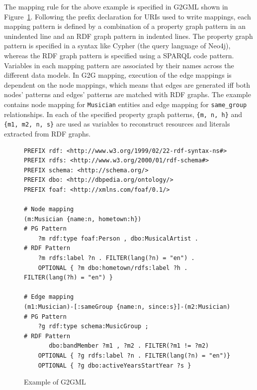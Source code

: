 \documentclass[runningheads]{llncs}
\begin{document}
The mapping rule for the above example is specified in G2GML shown in Figure~\ref{fig:g2gml}. Following the prefix declaration for URIs used to write mappings, each mapping pattern is defined by a combination of a property graph pattern in an unindented line and an RDF graph pattern in indented lines. The property graph pattern is specified in a syntax like Cypher (the query language of Neo4j), whereas the RDF graph pattern is specified using a SPARQL code pattern. 
Variables in each mapping pattern are associated by their names across the different data models. 
In G2G mapping, execution of the edge mappings is dependent on the node mappings, which means that edges are generated iff both nodes' patterns and edges' patterns are matched with RDF graphs. 
The example contains node mapping for \texttt{Musician} entities and edge mapping for \texttt{same\_group} relationships.
In each of the specified property graph patterns, \texttt{\{m, n, h\}} and \texttt{\{m1, m2, n, s\}} are used as variables to reconstruct resources and literals extracted from RDF graphs. 
 
\begin{figure}[!t]
\vspace{2mm}
\begin{scriptsize}
\begin{verbatim}
PREFIX rdf: <http://www.w3.org/1999/02/22-rdf-syntax-ns#>
PREFIX rdfs: <http://www.w3.org/2000/01/rdf-schema#>
PREFIX schema: <http://schema.org/>
PREFIX dbo: <http://dbpedia.org/ontology/>
PREFIX foaf: <http://xmlns.com/foaf/0.1/>
 
# Node mapping
(m:Musician {name:n, hometown:h})                            # PG Pattern
    ?m rdf:type foaf:Person , dbo:MusicalArtist .            # RDF Pattern
    ?m rdfs:label ?n . FILTER(lang(?n) = "en") .
    OPTIONAL { ?m dbo:hometown/rdfs:label ?h . FILTER(lang(?h) = "en") }
 
# Edge mapping
(m1:Musician)-[:sameGroup {name:n, since:s}]-(m2:Musician)  # PG Pattern
    ?g rdf:type schema:MusicGroup ;                          # RDF Pattern
       dbo:bandMember ?m1 , ?m2 . FILTER(?m1 != ?m2)
    OPTIONAL { ?g rdfs:label ?n . FILTER(lang(?n) = "en")}
    OPTIONAL { ?g dbo:activeYearsStartYear ?s }
\end{verbatim}
\end{scriptsize}
\caption{Example of G2GML}
\label{fig:g2gml}
\end{figure}
 
\end{document}
